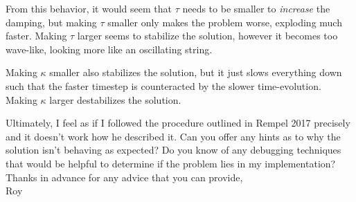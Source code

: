 \documentclass[10pt,letterpaper]{article}
\begin{document}
	From this behavior, it would seem that $\tau$ needs to be smaller to \textit{increase} the damping, but making $\tau$ smaller only makes the problem worse, exploding much faster.  Making $\tau$ larger seems to stabilize the solution, however it becomes too wave-like, looking more like an oscillating string.
	
	Making $\kappa$ smaller also stabilizes the solution, but it just slows everything down such that the faster timestep is counteracted by the slower time-evolution. Making $\kappa$ larger destabilizes the solution.
	
	Ultimately, I feel as if I followed the procedure outlined in Rempel 2017 precisely and it doesn't work how he described it. Can you offer any hints as to why the solution isn't behaving as expected? Do you know of any debugging techniques that would be helpful to determine if the problem lies in my implementation? \\
	 
	 \noindent
	Thanks in advance for any advice that you can provide,\\
	Roy
	
\end{document}
